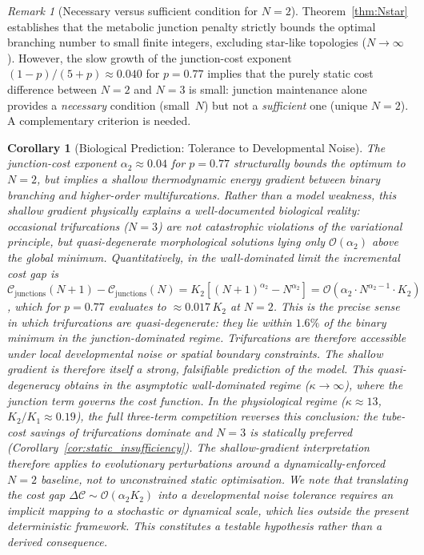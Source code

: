 \documentclass[11pt,a4paper]{article}
\newtheorem{corollary}[theorem]{Corollary}
\theoremstyle{remark}
\newtheorem{remark}{Remark}
\begin{document}
\begin{remark}[Necessary versus sufficient condition for $N = 2$]
Theorem~\ref{thm:Nstar} establishes that the metabolic junction penalty strictly
bounds the optimal branching number to small finite integers, excluding
star-like topologies ($N \to \infty$). However, the slow growth of the
junction-cost exponent $(1-p)/(5+p) \approx 0.040$ for $p = 0.77$ implies that
the purely static cost difference between $N = 2$ and $N = 3$ is small: junction
maintenance alone provides a \emph{necessary} condition (small~$N$) but not a
\emph{sufficient} one (unique $N = 2$). A complementary criterion is needed.
\end{remark}

\begin{corollary}[Biological Prediction: Tolerance to Developmental Noise]
\label{cor:noise}
The junction-cost exponent $\alpha_2 \approx 0.04$ for $p=0.77$ structurally
bounds the optimum to $N=2$, but implies a shallow thermodynamic energy gradient
between binary branching and higher-order multifurcations. Rather than a model
weakness, this shallow gradient physically explains a well-documented biological
reality: occasional trifurcations ($N=3$) are not catastrophic violations of the
variational principle, but quasi-degenerate morphological solutions lying only
$\mathcal{O}(\alpha_2)$ above the global minimum.
Quantitatively, in the wall-dominated limit the incremental cost gap
is $\mathcal{C}_{\mathrm{junctions}}(N+1) - \mathcal{C}_{\mathrm{junctions}}(N)
= K_2\left[(N+1)^{\alpha_2} - N^{\alpha_2}\right]
= \mathcal{O}(\alpha_2 \cdot N^{\alpha_2 - 1} \cdot K_2)$,
which for $p = 0.77$ evaluates to $\approx 0.017\,K_2$ at $N=2$.
This is the precise sense in which trifurcations are quasi-degenerate:
they lie within $1.6\%$ of the binary minimum in the junction-dominated
regime. Trifurcations are therefore accessible under local
developmental noise or spatial boundary constraints. The shallow gradient is
therefore itself a strong, falsifiable prediction of the model.
This quasi-degeneracy obtains in the asymptotic wall-dominated regime
($\kappa \to \infty$), where the junction term governs the cost
function. In the physiological regime ($\kappa \approx 13$,
$K_2/K_1 \approx 0.19$), the full three-term competition reverses
this conclusion: the tube-cost savings of trifurcations dominate and
$N=3$ is statically preferred (Corollary~\ref{cor:static_insufficiency}).
The shallow-gradient interpretation therefore applies to evolutionary
perturbations around a dynamically-enforced $N=2$ baseline, not to
unconstrained static optimisation.
We note that translating the cost gap $\Delta\mathcal{C} \sim
\mathcal{O}(\alpha_2 K_2)$ into a developmental noise tolerance
requires an implicit mapping to a stochastic or dynamical scale,
which lies outside the present deterministic framework. This
constitutes a testable hypothesis rather than a derived consequence.
\end{corollary}
\end{document}
